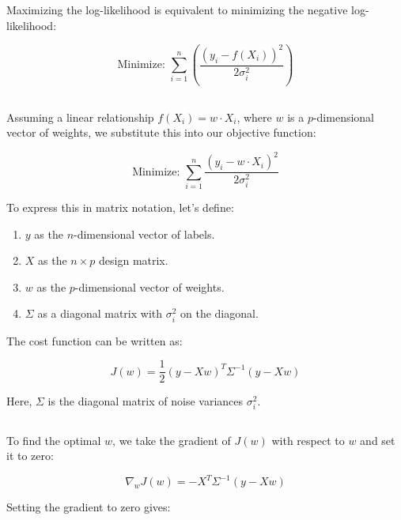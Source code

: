 \documentclass[oneside,solution]{seu-ml-assign}
\begin{document}
Maximizing the log-likelihood is equivalent to minimizing the negative log-likelihood:

\begin{equation}
  \text{Minimize: } \sum_{i=1}^n \left( \frac{(y_i - f(X_i))^2}{2\sigma_i^2} \right)
\end{equation}


\subsection{}
Assuming a linear relationship \( f(X_i) = w \cdot X_i \), where \( w \) is a \( p \)-dimensional vector of weights, we substitute this into our objective function:

\begin{equation}
  \text{Minimize: } \sum_{i=1}^n \frac{(y_i - w \cdot X_i)^2}{2\sigma_i^2}
\end{equation}

To express this in matrix notation, let's define:
\begin{enumerate}
  \item \( y \) as the \( n \)-dimensional vector of labels.
  \item \( X \) as the \( n \times p \) design matrix.
  \item \( w \) as the \( p \)-dimensional vector of weights.
  \item \( \Sigma \) as a diagonal matrix with \( \sigma_i^2 \) on the diagonal.
\end{enumerate}

The cost function can be written as:

\begin{equation}
  J(w) = \frac{1}{2} (y - Xw)^T \Sigma^{-1} (y - Xw)
\end{equation}

Here, \( \Sigma \) is the diagonal matrix of noise variances \( \sigma_i^2 \).


\subsection{}
To find the optimal \( w \), we take the gradient of \( J(w) \) with respect to \( w \) and set it to zero:

\begin{equation}
  \nabla_w J(w) = -X^T \Sigma^{-1} (y - Xw)
\end{equation}

Setting the gradient to zero gives:
\end{document}
